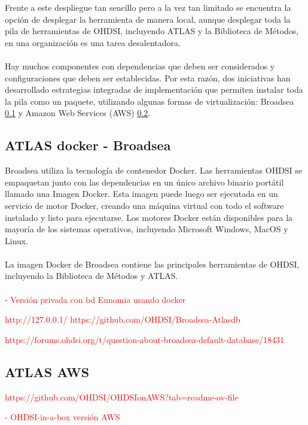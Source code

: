 \documentclass{article}
\begin{document}
Frente a este despliegue tan sencillo pero a la vez tan limitado se encuentra la opción de desplegar la herramienta de manera local, aunque desplegar toda la pila de herramientas de OHDSI, incluyendo ATLAS y la Biblioteca de Métodos, en una organización es una tarea desalentadora. 
\\
\\
Hay muchos componentes con dependencias que deben ser considerados y configuraciones que deben ser establecidas. Por esta razón, dos iniciativas han desarrollado estrategias integradas de implementación que permiten instalar toda la pila como un paquete, utilizando algunas formas de virtualización: Broadsea \ref{cap:AtlasBroadsea} y Amazon Web Services (AWS) \ref{cap:AtlasAWS}. \cite{TheBookOfOhdsi}

\subsection{ATLAS docker - Broadsea}\label{cap:AtlasBroadsea}

Broadsea utiliza la tecnología de contenedor Docker. Las herramientas OHDSI se empaquetan junto con las dependencias en un único archivo binario portátil llamado una Imagen Docker. Esta imagen puede luego ser ejecutada en un servicio de motor Docker, creando una máquina virtual con todo el software instalado y listo para ejecutarse. Los motores Docker están disponibles para la mayoría de los sistemas operativos, incluyendo Microsoft Windows, MacOS y Linux.  
\\
\\
La imagen Docker de Broadsea contiene las principales herramientas de OHDSI, incluyendo la Biblioteca de Métodos y ATLAS. \cite{TheBookOfOhdsi}
\\
\\
\textcolor{red}{- Versión privada con bd Eunomia usando docker}


\textcolor{red}{http://127.0.0.1/}
\textcolor{red}{https://github.com/OHDSI/Broadsea-Atlasdb}

\textcolor{red}{https://forums.ohdsi.org/t/question-about-broadsea-default-database/18431}


\subsection{ATLAS AWS}\label{cap:AtlasAWS}

\textcolor{red}{https://github.com/OHDSI/OHDSIonAWS?tab=readme-ov-file}

\textcolor{red}{- OHDSI-in-a-box versión AWS}
\end{document}
